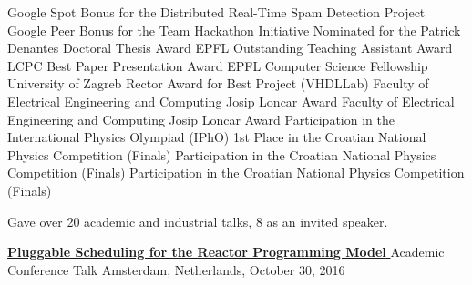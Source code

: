 \documentclass[9pt]{article}
\begin{document}
\bigskip

\medskip
\medskip
\medskip


\noindent Google Spot Bonus for the Distributed Real-Time Spam Detection Project
\newline\noindent Google Peer Bonus for the Team Hackathon Initiative 
\newline\noindent Nominated for the Patrick Denantes Doctoral Thesis Award 
\newline\noindent EPFL Outstanding Teaching Assistant Award 
\newline\noindent LCPC Best Paper Presentation Award 
\newline\noindent EPFL Computer Science Fellowship 
\newline\noindent University of Zagreb Rector Award for Best Project (VHDLLab)
\newline\noindent Faculty of Electrical Engineering and Computing Josip Loncar Award
\newline\noindent Faculty of Electrical Engineering and Computing Josip Loncar Award
\newline\noindent Participation in the International Physics Olympiad (IPhO)
\newline\noindent 1st Place in the Croatian National Physics Competition (Finals)
\newline\noindent Participation in the Croatian National Physics Competition (Finals)
\newline\noindent Participation in the Croatian National Physics Competition (Finals)

\bigskip




\medskip
{}

\vspace{-0.02in}

\noindent
Gave over 20 academic and industrial talks, 8 as an invited speaker.
\newline

\noindent\href{http://conf.researchr.org/event/agere-2016/agere2016-pluggable-scheduling-for-the-reactor-programming-model}
{\bf Pluggable Scheduling for the Reactor Programming Model }
\vspace{-0.03in}
\newline\noindent Academic Conference Talk
\dates{}
\linebreak\noindent Amsterdam, Netherlands, October 30, 2016
\bigskip
\end{document}
